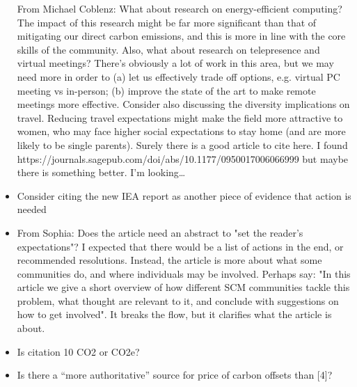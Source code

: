 \documentclass[12pt]{article}
\begin{document}
\begin{itemize}
From Michael Coblenz:
What about research on energy-efficient computing? The impact of this research might be far more significant than that of mitigating our direct carbon emissions, and this is more in line with the core skills of the community.
Also, what about research on telepresence and virtual meetings? There’s obviously a lot of work in this area, but we may need more in order to (a) let us effectively trade off options, e.g. virtual PC meeting vs in-person; (b) improve the state of the art to make remote meetings more effective.
Consider also discussing the diversity implications on travel. Reducing travel expectations might make the field more attractive to women, who may face higher social expectations to stay home (and are more likely to be single parents). Surely there is a good article to cite here. I found https://journals.sagepub.com/doi/abs/10.1177/0950017006066999 but maybe there is something better. I’m looking…
\item 
Consider citing the new IEA report as another piece of evidence that action is needed
\item 
From Sophia: Does the article need an abstract to "set the reader's expectations"? I expected that there would be a list of actions in the end, or recommended resolutions. Instead, the article is more about what some communities do, and where individuals may be involved.  Perhaps say: "In this article we give a short overview of how different SCM communities tackle this problem, what thought are relevant to it, and conclude with suggestions on how to get involved". It breaks the flow, but it clarifies what the article is about.
\item 
Is citation 10 CO2 or CO2e?
\item 
Is there a ``more authoritative'' source for price of carbon offsets than [4]?
\end{itemize}
\fi

\end{document}
